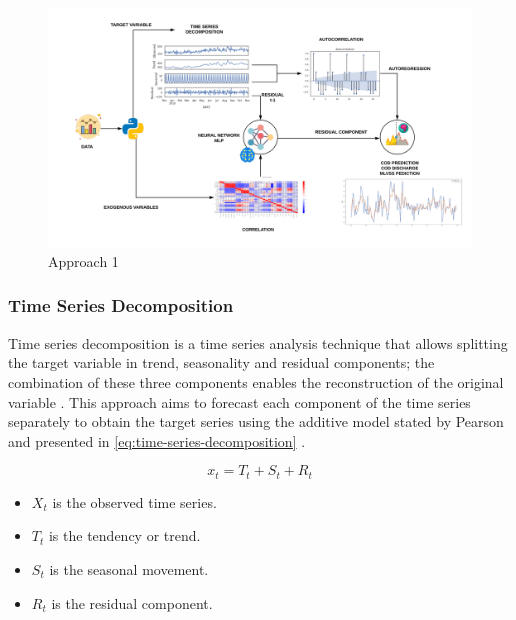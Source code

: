 \begin{figure}[h]
\centering
\includegraphics[width=\linewidth]{figures/Ch4/Approach1.png}
\caption{Approach 1}
\label{f:Approach 1}
\end{figure}

\subsubsection{Time Series Decomposition}
\label{ss:time-series-decomposition}

Time series decomposition is a time series analysis technique that allows splitting the target variable in trend, seasonality and residual components; the combination of these three components enables the reconstruction of the original variable \cite{Cryer2008}. This approach aims to forecast each component of the time series separately to obtain the target series using the additive model stated by Pearson and presented in \autoref{eq:time-series-decomposition}
\cite{dagum2010time}.

\begin{equation}\label{eq:time-series-decomposition}
    x_t = T_t + S_t + R_t
\end{equation}

\begin{itemize}
    \item \begin{math}X_t\end{math} is the observed time series.
    \item \begin{math}T_t\end{math} is the tendency or trend.
    \item \begin{math}S_t\end{math} is the seasonal movement.
    \item \begin{math}R_t\end{math} is the residual component.
\end{itemize}

